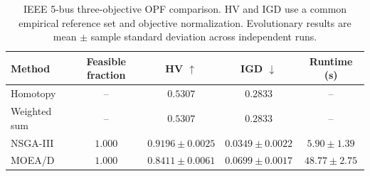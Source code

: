 \begin{table}[t]
\centering
\caption{IEEE 5-bus three-objective OPF comparison. HV and IGD use a common empirical reference set and objective normalization. Evolutionary results are mean $\pm$ sample standard deviation across independent runs.}
\label{tab:ieee5_comparison}
\begin{tabular}{lcccc}
\hline
Method & Feasible fraction & HV $\uparrow$ & IGD $\downarrow$ & Runtime (s) \\
\hline
Homotopy & -- & $0.5307$ & $0.2833$ & -- \\
Weighted sum & -- & $0.5307$ & $0.2833$ & -- \\
NSGA-III & $1.000$ & $0.9196\pm 0.0025$ & $0.0349\pm 0.0022$ & $5.90\pm 1.39$ \\
MOEA/D & $1.000$ & $0.8411\pm 0.0061$ & $0.0699\pm 0.0017$ & $48.77\pm 2.75$ \\
\hline
\end{tabular}
\end{table}
